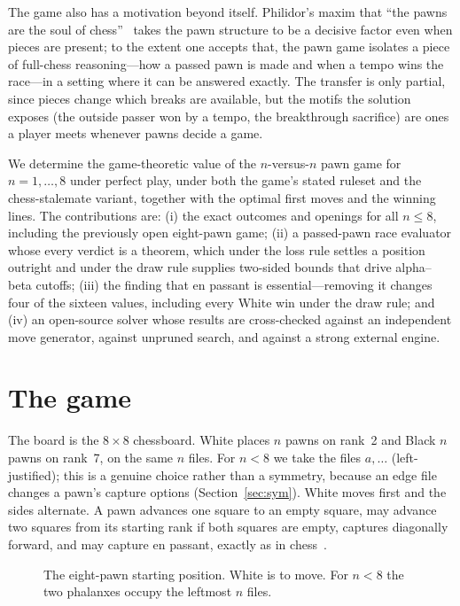 \documentclass[11pt]{article}
\theoremstyle{plain}
\theoremstyle{definition}
\newcommand{\pg}[1]{\chessboard[setfen={#1}, showmover=false, boardfontsize=13pt, label=false]}
\begin{document}
The game also has a motivation beyond itself. Philidor's maxim that ``the pawns are
the soul of chess''~\cite{philidor1749} takes the pawn structure to be a decisive
factor even when pieces are present; to the extent one accepts that, the pawn game
isolates a piece of full-chess reasoning---how a passed pawn is made and when a
tempo wins the race---in a setting where it can be answered exactly. The transfer is
only partial, since pieces change which breaks are available, but the motifs the
solution exposes (the outside passer won by a tempo, the breakthrough sacrifice) are
ones a player meets whenever pawns decide a game.

We determine the game-theoretic value of the $n$-versus-$n$ pawn game for
$n=1,\dots,8$ under perfect play, under both the game's stated ruleset and the
chess-stalemate variant, together with the optimal first moves and the winning
lines. The contributions are: (i) the exact outcomes and openings for all $n\le
8$, including the previously open eight-pawn game; (ii) a passed-pawn race
evaluator whose every verdict is a theorem, which under the loss rule settles a
position outright and under the draw rule supplies two-sided bounds that drive
alpha--beta cutoffs; (iii) the finding that en passant is essential---removing it
changes four of the sixteen values, including every White win under the draw rule;
and (iv) an open-source solver whose results are cross-checked against an
independent move generator, against unpruned search, and against a strong external
engine.

\section{The game}\label{sec:game}

The board is the $8\times8$ chessboard. White places $n$ pawns on rank~2 and
Black $n$ pawns on rank~7, on the same $n$ files. For $n<8$ we take the files
$a,\dots$ (left-justified); this is a genuine choice rather than a symmetry,
because an edge file changes a pawn's capture options (Section~\ref{sec:sym}).
White moves first and the sides alternate. A pawn advances one square to an empty
square, may advance two squares from its starting rank if both squares are empty,
captures diagonally forward, and may capture en passant, exactly as in
chess~\cite{pawngame}.

\begin{figure}[t]
\centering
\pg{8/pppppppp/8/8/8/8/PPPPPPPP/8 w - - 0 1}
\caption{The eight-pawn starting position. White is to move. For $n<8$ the two
phalanxes occupy the leftmost $n$ files.}
\label{fig:start}
\end{figure}
\end{document}
